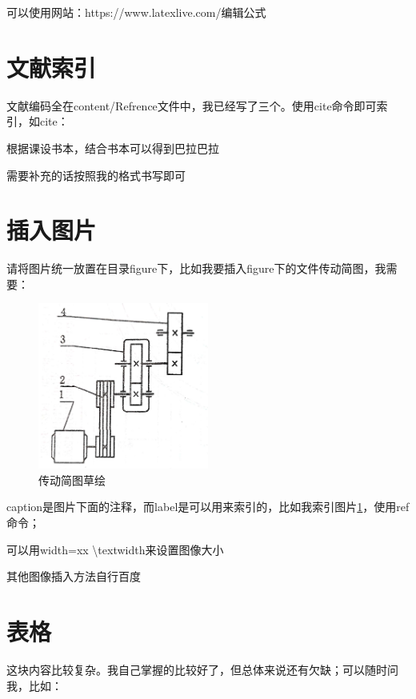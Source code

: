 可以使用网站：https://www.latexlive.com/编辑公式

\section{文献索引}

文献编码全在content/Refrence文件中，我已经写了三个。使用cite命令即可索引，如cite：

根据课设书本\cite{1}，结合书本\cite{2}可以得到巴拉巴拉

需要补充的话按照我的格式书写即可

\section{插入图片}

请将图片统一放置在目录figure下，比如我要插入figure下的文件传动简图，我需要：

\begin{figure}[H]  %
    \centering  %
    \includegraphics[width=0.5\textwidth]{figure/传动简图.png}
    \caption{传动简图草绘}
    \label{传动简图}
\end{figure}

caption是图片下面的注释，而label是可以用来索引的，比如我索引图片\ref{传动简图}，使用ref命令；

可以用width=xx \textbackslash textwidth来设置图像大小

其他图像插入方法自行百度

\section{表格}

这块内容比较复杂。我自己掌握的比较好了，但总体来说还有欠缺；可以随时问我，比如：

